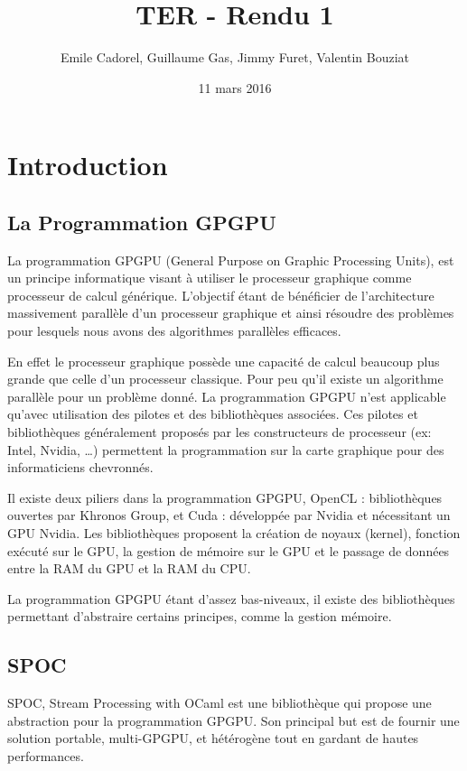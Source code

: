 \documentclass{report}
\title{TER - Rendu 1}
\author{Emile Cadorel, Guillaume Gas, Jimmy Furet, Valentin Bouziat}
\date{11 mars 2016}
\begin{document}
\maketitle

\chapter{Introduction}

\section{La Programmation GPGPU}
La programmation GPGPU (General Purpose on Graphic Processing Units), est un principe informatique visant à utiliser le processeur graphique comme processeur de calcul générique. L’objectif étant de bénéficier de l’architecture massivement parallèle d’un processeur graphique et ainsi résoudre des problèmes pour lesquels nous avons des algorithmes parallèles efficaces.\newline

En effet le processeur graphique possède une capacité de calcul beaucoup plus grande que celle d’un processeur classique. Pour peu qu’il existe un algorithme parallèle pour un problème donné. La programmation GPGPU n’est applicable qu’avec utilisation des pilotes et des bibliothèques associées. Ces pilotes et bibliothèques généralement proposés par les constructeurs de processeur (ex: Intel, Nvidia, …) permettent la programmation sur la carte graphique pour des informaticiens chevronnés.\newline 

Il existe deux piliers dans la programmation GPGPU, OpenCL : bibliothèques ouvertes par Khronos Group, et Cuda : développée par Nvidia et nécessitant un GPU Nvidia.
Les bibliothèques proposent la création de noyaux  (kernel), fonction exécuté sur le GPU, la gestion de mémoire sur le GPU et le passage de données entre la RAM du GPU et la RAM du CPU.\newline

La programmation GPGPU étant d’assez bas-niveaux, il existe des bibliothèques permettant d’abstraire certains principes, comme la gestion mémoire. 

\section{SPOC}
SPOC, Stream Processing with OCaml est une bibliothèque qui propose une abstraction pour la programmation GPGPU. Son principal but est de fournir une solution portable, multi-GPGPU, et hétérogène tout en gardant de hautes performances.\newline
\end{document}
